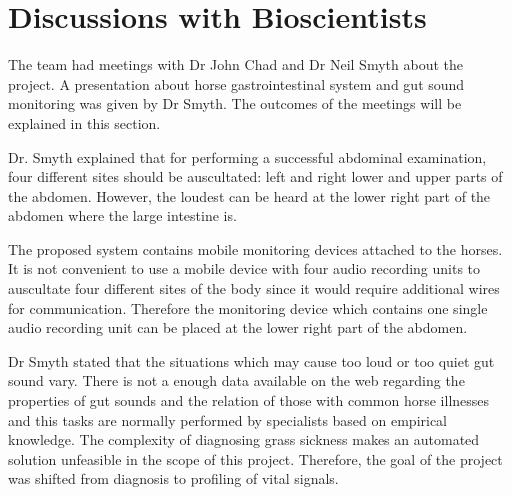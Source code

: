 \section{Discussions with Bioscientists}
The team had meetings with Dr John Chad and Dr Neil Smyth about the project. A presentation about horse gastrointestinal system and gut sound monitoring was given by Dr Smyth. The outcomes of the meetings will be explained in this section. 

Dr. Smyth explained that for performing a successful abdominal examination, four different sites should be auscultated: left and right lower and upper parts of the abdomen. However, the loudest can be heard at the lower right part of the abdomen where the large intestine is. 

The proposed system contains mobile monitoring devices attached to the horses. It is not convenient to use a mobile device with four audio recording units to auscultate four different sites of the body since it would require additional wires for communication. Therefore the monitoring device which contains one single audio recording unit can be placed at the lower right part of the abdomen.

Dr Smyth stated that the situations which may cause too loud or too quiet gut sound vary. There is not a enough data available on the web regarding the properties of gut sounds and the relation of those with common horse illnesses and this tasks are normally performed by specialists based on empirical knowledge. The complexity of diagnosing grass sickness makes an automated solution unfeasible in the scope of this project. Therefore, the goal of the project was shifted from diagnosis to profiling of vital signals.
